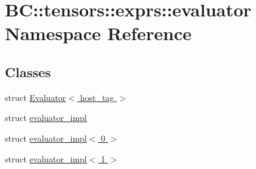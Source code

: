 \hypertarget{namespaceBC_1_1tensors_1_1exprs_1_1evaluator}{}\section{BC\+:\+:tensors\+:\+:exprs\+:\+:evaluator Namespace Reference}
\label{namespaceBC_1_1tensors_1_1exprs_1_1evaluator}
\subsection*{Classes}
\begin{DoxyCompactItemize}
\item 
struct \hyperlink{structBC_1_1tensors_1_1exprs_1_1evaluator_1_1Evaluator_3_01host__tag_01_4}{Evaluator$<$ host\+\_\+tag $>$}
\item 
struct \hyperlink{structBC_1_1tensors_1_1exprs_1_1evaluator_1_1evaluator__impl}{evaluator\+\_\+impl}
\item 
struct \hyperlink{structBC_1_1tensors_1_1exprs_1_1evaluator_1_1evaluator__impl_3_010_01_4}{evaluator\+\_\+impl$<$ 0 $>$}
\item 
struct \hyperlink{structBC_1_1tensors_1_1exprs_1_1evaluator_1_1evaluator__impl_3_011_01_4}{evaluator\+\_\+impl$<$ 1 $>$}
\end{DoxyCompactItemize}

